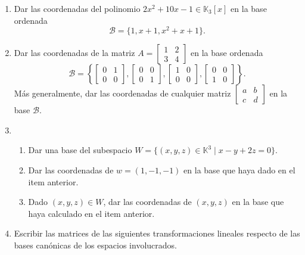 \begin{enumerate}[topsep=6pt, itemsep=.4cm]


\item Dar las coordenadas del polinomio $2x^2+10x-1\in\mathbb{K}_3[x]$ en la base ordenada $$\mathcal{B}=\{1,x+1,x^2+x+1\}.$$

\item Dar las coordenadas de la matriz 
$A=\begin{bmatrix}
    1&2\\3&4 
    \end{bmatrix}
$ en la base ordenada 
$$
\mathcal{B}=\left\{
\begin{bmatrix}
    0&1\\0&0 
    \end{bmatrix},
\begin{bmatrix}
    0&0\\0&1 
    \end{bmatrix},
    \begin{bmatrix}
    1&0\\0&0 
    \end{bmatrix},
    \begin{bmatrix}
    0&0\\1&0 
    \end{bmatrix}
\right\}.
$$
Más generalmente, dar las coordenadas de cualquier matriz $\begin{bmatrix}
    a&b\\c&d 
    \end{bmatrix}$ en la base $\mathcal{B}$.


\item 
\begin{enumerate}
    \item Dar una base del subespacio $W=\{(x,y,z)\in\mathbb{K}^3\mid x-y+2z=0\}$. 
    \item Dar las coordenadas de $w=(1,-1,-1)$ en la base que haya dado en el item anterior.
    \item Dado $(x,y,z)\in W$, dar las coordenadas de $(x,y,z)$ en la base que haya calculado en el item anterior. 
\end{enumerate}



\item \label{lineales1-bases} Escribir las matrices de las siguientes transformaciones lineales respecto de las bases canónicas de los espacios involucrados.


\end{enumerate}
